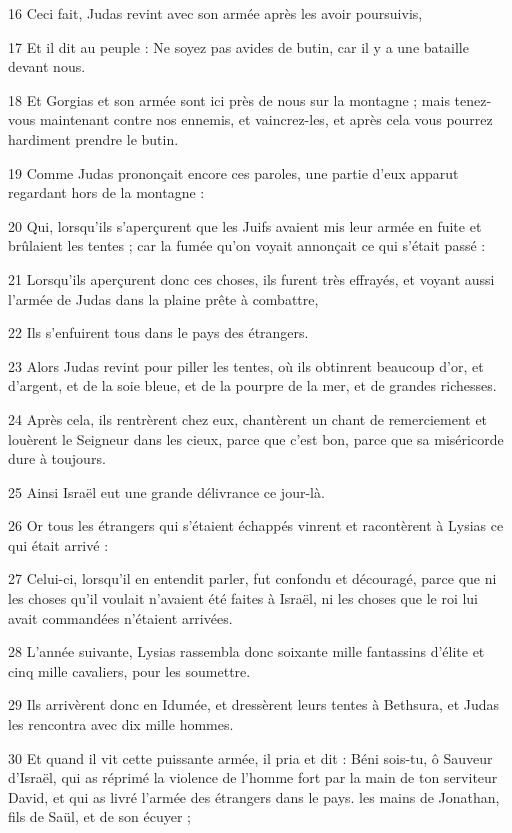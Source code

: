 \par 16 Ceci fait, Judas revint avec son armée après les avoir poursuivis,
\par 17 Et il dit au peuple : Ne soyez pas avides de butin, car il y a une bataille devant nous.
\par 18 Et Gorgias et son armée sont ici près de nous sur la montagne ; mais tenez-vous maintenant contre nos ennemis, et vaincrez-les, et après cela vous pourrez hardiment prendre le butin.
\par 19 Comme Judas prononçait encore ces paroles, une partie d'eux apparut regardant hors de la montagne :
\par 20 Qui, lorsqu'ils s'aperçurent que les Juifs avaient mis leur armée en fuite et brûlaient les tentes ; car la fumée qu'on voyait annonçait ce qui s'était passé :
\par 21 Lorsqu'ils aperçurent donc ces choses, ils furent très effrayés, et voyant aussi l'armée de Judas dans la plaine prête à combattre,
\par 22 Ils s'enfuirent tous dans le pays des étrangers.
\par 23 Alors Judas revint pour piller les tentes, où ils obtinrent beaucoup d'or, et d'argent, et de la soie bleue, et de la pourpre de la mer, et de grandes richesses.
\par 24 Après cela, ils rentrèrent chez eux, chantèrent un chant de remerciement et louèrent le Seigneur dans les cieux, parce que c'est bon, parce que sa miséricorde dure à toujours.
\par 25 Ainsi Israël eut une grande délivrance ce jour-là.
\par 26 Or tous les étrangers qui s'étaient échappés vinrent et racontèrent à Lysias ce qui était arrivé :
\par 27 Celui-ci, lorsqu'il en entendit parler, fut confondu et découragé, parce que ni les choses qu'il voulait n'avaient été faites à Israël, ni les choses que le roi lui avait commandées n'étaient arrivées.
\par 28 L'année suivante, Lysias rassembla donc soixante mille fantassins d'élite et cinq mille cavaliers, pour les soumettre.
\par 29 Ils arrivèrent donc en Idumée, et dressèrent leurs tentes à Bethsura, et Judas les rencontra avec dix mille hommes.
\par 30 Et quand il vit cette puissante armée, il pria et dit : Béni sois-tu, ô Sauveur d'Israël, qui as réprimé la violence de l'homme fort par la main de ton serviteur David, et qui as livré l'armée des étrangers dans le pays. les mains de Jonathan, fils de Saül, et de son écuyer ;
